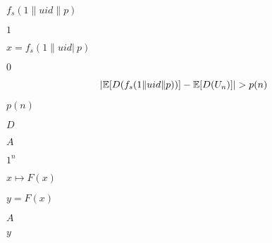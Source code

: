 \documentclass[10pt]{book}
\begin{document}
\begin{mdSnippets}
\begin{mdInlineSnippet}[4489186988428c079e1831587d66e9ef]
$f_s(1 \| uid \| p)$\end{mdInlineSnippet}%
\begin{mdInlineSnippet}[c4ca4238a0b923820dcc509a6f75849b]%
$1$\end{mdInlineSnippet}%
\begin{mdInlineSnippet}[e4732217de270b5c0519b7359d9059e3]%
$x = f_s(1 \| uid |\ p)$\end{mdInlineSnippet}%
\begin{mdInlineSnippet}%
$0$\end{mdInlineSnippet}%
\begin{mdDisplaySnippet}[b19a3ec3359ded19e2cc15a4db100e75]%
\[%
 |\E[D(f_s(1 \| uid \| p))] - \E[D(U_n)]| > p(n)
\]%
\end{mdDisplaySnippet}%
\begin{mdInlineSnippet}%
$p(n)$\end{mdInlineSnippet}%
\begin{mdInlineSnippet}[f623e75af30e62bbd73d6df5b50bb7b5]%
$D$\end{mdInlineSnippet}%
\begin{mdInlineSnippet}[7fc56270e7a70fa81a5935b72eacbe29]%
$A$\end{mdInlineSnippet}%
\begin{mdInlineSnippet}%
$1^n$\end{mdInlineSnippet}%
\begin{mdInlineSnippet}%
$x \mapsto F(x)$\end{mdInlineSnippet}%
\begin{mdInlineSnippet}[e31272d68005c5360a868313e6863ce4]%
$y = F(x)$\end{mdInlineSnippet}%
\begin{mdInlineSnippet}[7fc56270e7a70fa81a5935b72eacbe29]%
$A$\end{mdInlineSnippet}%
\begin{mdInlineSnippet}[415290769594460e2e485922904f345d]%
$y$\end{mdInlineSnippet}%
\begin{mdInlineSnippet}[f623e75af30e62bbd73d6df5b50bb7b5]%

\end{mdInlineSnippet}
\end{mdSnippets}
\end{document}
